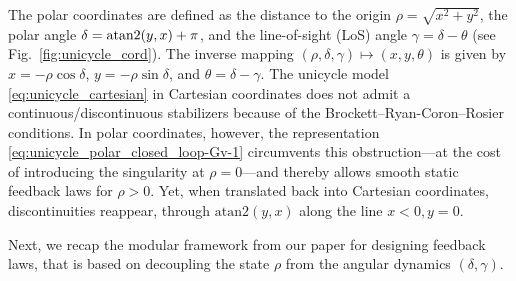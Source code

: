 \documentclass[letterpaper, 10 pt, conference]{ieeeconf}  %
\begin{document}
The polar coordinates are defined as the distance to the origin \(\rho=\sqrt{x^2+y^2}\), the polar angle \(\delta=\text{{\rm atan2}}(y,x)+\pi\), and the line-of-sight (LoS) angle \(\gamma=\delta-\theta\) (see Fig.~\ref{fig:unicycle_cord}). 
The inverse mapping  \((\rho,\delta,\gamma)\mapsto(x,y,\theta)\) is given by \(x=-\rho\cos\delta\), \(y=-\rho\sin\delta\), and \(\theta=\delta-\gamma\).
The unicycle model \eqref{eq:unicycle_cartesian} in Cartesian coordinates does not admit a continuous/discontinuous stabilizers because of the Brockett–Ryan-Coron–Rosier conditions. In polar coordinates, however, the representation \eqref{eq:unicycle_polar_closed_loop-Gv-1} circumvents this obstruction—at the cost of introducing the singularity at $\rho=0$—and thereby allows smooth static feedback laws for $\rho>0$. Yet, when translated back into Cartesian coordinates, discontinuities reappear, through $\text{atan2}(y,x)$ along the line ${x<0,y=0}$.

Next, we recap the modular framework from our paper \cite{todorovski2025_CLF} for designing feedback laws, that is based on decoupling the state $\rho$ from the angular dynamics $(\delta,\gamma)$. 


\label{sec-preliminaries}
\end{document}
